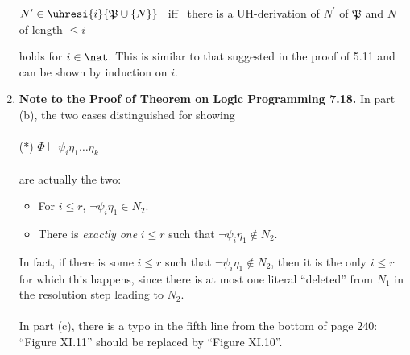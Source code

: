 \begin{enumerate}[1.]
\begin{center}
\begin{minipage}{10cm}
$N^\prime \in \uhresi{i}{\mathfrak{P} \cup \{ N \}}$ \ iff \ there is a UH-derivation of $N^\prime$ of $\mathfrak{P}$ and $N$ of length $\leq i$
\end{minipage}
\end{center}
holds for $i \in \nat$. This is similar to that suggested in the proof of 5.11 and can be shown by induction on $i$.
%
\item \textbf{Note to the Proof of Theorem on Logic Programming 7.18.} In part (b), the two cases distinguished for showing\\
\ \\
($\ast$) \hfill $\Phi \vdash \psi_i \eta_1 \ldots \eta_k$ \hfill \phantom{($\ast$)}\\
\ \\
are actually the two:
\begin{itemize}
\item For $i \leq r$, $\neg\psi_i \eta_1 \in N_2$.
\item There is \emph{exactly one} $i \leq r$ such that $\neg\psi_i \eta_1 \not\in N_2$.
\end{itemize}
In fact, if there is some $i \leq r$ such that $\neg\psi_i \eta_1 \not\in N_2$, then it is the only $i \leq r$ for which this happens, since there is at most one literal ``deleted'' from $N_1$ in the resolution step leading to $N_2$.\\
\ \\
In part (c), there is a typo in the fifth line from the bottom of page 240: ``Figure XI.11'' should be replaced by ``Figure XI.10''.
\end{enumerate}
